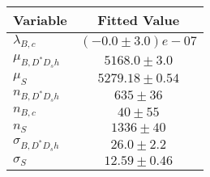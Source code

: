 \begin{tabular}[t]{lc}
\hline
Variable &Fitted Value\\
\hline\hline
$\lambda_{B,c}$&$(-0.0\pm3.0)e-07$\\
\hline
$\mu_{B, D^* D_s h}$&$5168.0\pm3.0$\\
\hline
$\mu_S$&$5279.18\pm0.54$\\
\hline
$n_{B, D^* D_s h}$&$635\pm36$\\
\hline
$n_{B,c}$&$40\pm55$\\
\hline
$n_S$&$1336\pm40$\\
\hline
$\sigma_{B, D^* D_s h}$&$26.0\pm2.2$\\
\hline
$\sigma_S$&$12.59\pm0.46$\\
\hline
\end{tabular}